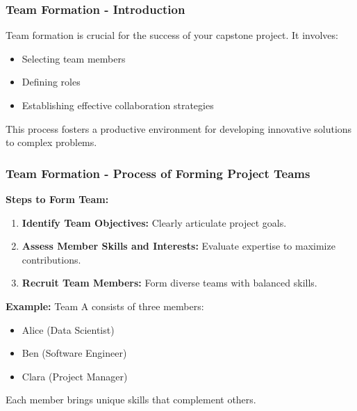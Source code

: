 \documentclass[aspectratio=169]{beamer}
\begin{document}
\begin{frame}[fragile]
    \frametitle{Team Formation - Introduction}
    Team formation is crucial for the success of your capstone project. It involves:
    \begin{itemize}
        \item Selecting team members
        \item Defining roles
        \item Establishing effective collaboration strategies
    \end{itemize}
    This process fosters a productive environment for developing innovative solutions to complex problems.
\end{frame}

\begin{frame}[fragile]
    \frametitle{Team Formation - Process of Forming Project Teams}
    \textbf{Steps to Form Team:}
    \begin{enumerate}
        \item \textbf{Identify Team Objectives:} Clearly articulate project goals.
        \item \textbf{Assess Member Skills and Interests:} Evaluate expertise to maximize contributions.
        \item \textbf{Recruit Team Members:} Form diverse teams with balanced skills.
    \end{enumerate}

    \textbf{Example:} Team A consists of three members:
    \begin{itemize}
        \item Alice (Data Scientist)
        \item Ben (Software Engineer)
        \item Clara (Project Manager)
    \end{itemize}
    Each member brings unique skills that complement others.
\end{frame}
\end{document}

